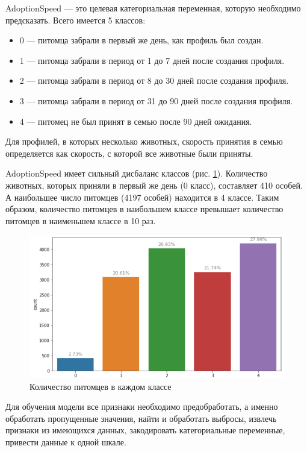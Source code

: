 \documentclass[14pt]{mmcs_article}
\begin{document}
AdoptionSpeed --- это целевая категориальная переменная, которую необходимо предсказать. Всего имеется 5 классов:

\begin{itemize}
	\item 0 --- питомца забрали в первый же день, как профиль был создан.
	\item 1 --- питомца забрали в период от 1 до 7 дней после создания профиля.
	\item 2 --- питомца забрали в период от 8 до 30 дней после создания профиля.
	\item 3 --- питомца забрали в период от 31 до 90 дней после создания профиля.
	\item 4 --- питомец не был принят в семью после 90 дней ожидания.
\end{itemize}

Для профилей, в которых несколько животных, скорость принятия в семью определяется как скорость, с которой все животные были приняты. 

AdoptionSpeed имеет сильный дисбаланс классов (рис. \ref{analyse:speed}). Количество животных, которых приняли в первый же день (0 класс), составляет 410 особей. А наибольшее число питомцев (4197 особей) находится в 4 классе. Таким образом, количество питомцев в наибольшем классе превышает количество питомцев в наименьшем классе в 10 раз.

\begin{figure}[H]
	\centering
	\includegraphics[scale=0.8]{speed.png}
	\caption{Количество питомцев в каждом классе}\label{analyse:speed}
\end{figure}

Для обучения модели все признаки необходимо предобработать, а именно обработать пропущенные значения, найти и обработать выбросы, извлечь признаки из имеющихся данных, закодировать категориальные переменные, привести данные к одной шкале.
\end{document}
